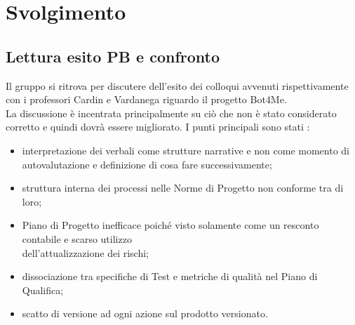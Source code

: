 \section{Svolgimento}

\subsection{Lettura esito PB e confronto }
Il gruppo si ritrova per discutere dell'esito dei colloqui avvenuti rispettivamente con i professori Cardin e Vardanega riguardo il progetto Bot4Me. \\
La discussione è incentrata principalmente su ciò che non è stato considerato corretto e quindi dovrà essere migliorato. I punti principali sono stati : 
\begin{itemize}
  \item interpretazione dei verbali come strutture narrative e non come momento di autovalutazione e definizione di cosa fare successivamente;
  \item struttura interna dei processi nelle Norme di Progetto non conforme tra di loro;
  \item Piano di Progetto inefficace poiché visto solamente come un resconto contabile e scarso utilizzo \\ dell'attualizzazione dei rischi;
  \item dissociazione tra specifiche di Test e metriche di qualità nel Piano di Qualifica; 
  \item scatto di versione ad ogni azione sul prodotto versionato.
\end{itemize}

